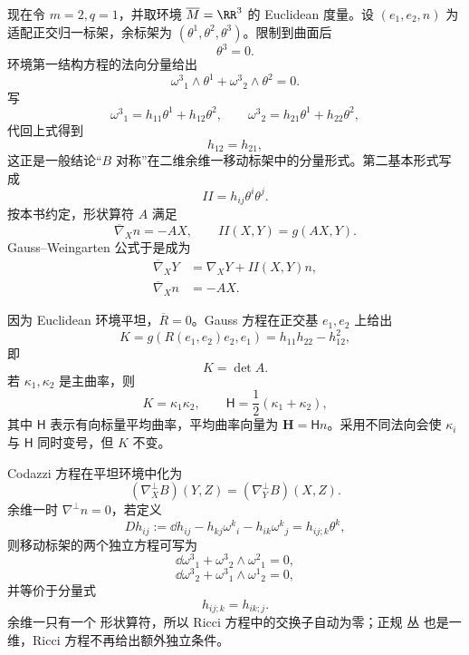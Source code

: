 现在令 $m=2,q=1$，并取环境 $\overline M=\RR^3$ 的 Euclidean 度量。设 $(e_1,e_2,n)$ 为适配正交归一标架，余标架为 $(\theta^1,\theta^2,\theta^3)$。限制到曲面后
\[
\theta^3=0.
\]
环境第一结构方程的法向分量给出
\begin{equation*}\omega^3{}_1\wedge\theta^1
+\omega^3{}_2\wedge\theta^2=0.
\end{equation*}
写
\[
\omega^3{}_1=h_{11}\theta^1+h_{12}\theta^2,
\qquad
\omega^3{}_2=h_{21}\theta^1+h_{22}\theta^2,
\]
代回上式得到
\begin{equation*}h_{12}=h_{21},
\end{equation*}
这正是一般结论“$B$ 对称”在二维余维一移动标架中的分量形式。第二基本形式写成
\begin{equation*}II=h_{ij}\theta^i\theta^j.
\end{equation*}
按本书约定，形状算符 $A$ 满足
\[
\overline\nabla_Xn=-AX,
\qquad
II(X,Y)=g(AX,Y).
\]
Gauss--Weingarten 公式于是成为
\begin{equation*}\boxed{
\begin{aligned}
\overline\nabla_XY&=\nabla_XY+II(X,Y)n,\\
\overline\nabla_Xn&=-AX.
\end{aligned}}
\end{equation*}

因为 Euclidean 环境平坦，$\overline R=0$。Gauss 方程在正交基 $e_1,e_2$ 上给出
\[
K
=g(R(e_1,e_2)e_2,e_1)
=h_{11}h_{22}-h_{12}^2,
\]
即
\begin{equation*}\boxed{K=\det A.}
\end{equation*}
若 $\kappa_1,\kappa_2$ 是主曲率，则
\[
K=\kappa_1\kappa_2,
\qquad
\mathsf H=\frac12(\kappa_1+\kappa_2),
\]
其中 $\mathsf H$ 表示有向标量平均曲率，平均曲率向量为 $\mathbf H=\mathsf H n$。采用不同法向会使 $\kappa_i$ 与 $\mathsf H$ 同时变号，但 $K$ 不变。

Codazzi 方程在平坦环境中化为
\[
(\nabla_X^\perp B)(Y,Z)
=(\nabla_Y^\perp B)(X,Z).
\]
余维一时 $\nabla^\perp n=0$，若定义
\[
Dh_{ij}
:=\dd h_{ij}-h_{kj}\omega^k{}_i-h_{ik}\omega^k{}_j
=h_{ij;k}\theta^k,
\]
则移动标架的两个独立方程可写为
\begin{equation*}\dd\omega^3{}_1+\omega^3{}_2\wedge\omega^2{}_1=0,
\end{equation*}
\begin{equation*}\dd\omega^3{}_2+\omega^3{}_1\wedge\omega^1{}_2=0,
\end{equation*}
并等价于分量式
\begin{equation*}\boxed{h_{ij;k}=h_{ik;j}.}
\end{equation*}
余维一只有一个 形状算符，所以 Ricci 方程中的交换子自动为零；正规 丛 也是一维，Ricci 方程不再给出额外独立条件。

